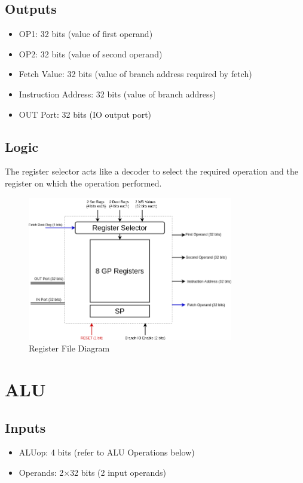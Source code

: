 \subsection{Outputs}
\begin{itemize}
    \item OP1: 32 bits (value of first operand)
    \item OP2: 32 bits (value of second operand)
    \item Fetch Value: 32 bits (value of branch address required by fetch)
    \item Instruction Address: 32 bits (value of branch address)
    \item OUT Port: 32 bits (IO output port)
\end{itemize}

\subsection{Logic}
The register selector acts like a decoder to select the required operation and the register on which the operation performed.

\begin{center}
    \begin{figure}[hp]
        \centering
        \includegraphics[width=0.8\textwidth]{images/reg_file}
        \caption{Register File Diagram}
        \label{fig:reg_file}
    \end{figure}
\end{center}

\section{ALU}

\subsection{Inputs}
\begin{itemize}
    \item ALUop: 4 bits (refer to ALU Operations below)
    \item Operands: 2$\times$32 bits (2 input operands)
\end{itemize}

